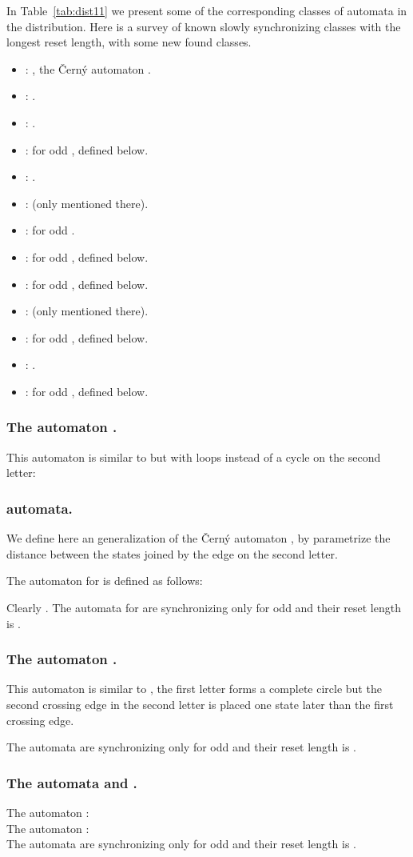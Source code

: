 \documentclass[runningheads,a4paper]{llncs}
\newcommand{\<}{\langle}
\renewcommand{\>}{\rangle}
\begin{document}
In Table~\ref{tab:dist11} we present some of the corresponding classes of automata in the distribution. Here is a survey of known slowly synchronizing classes with the longest reset length, with some new found classes.

\begin{itemize}
\item : , the \v{C}ern\'{y} automaton \cite{Ce1964}.
\item :  \cite{AGV2010}.
\item :  \cite{AGV2010}.
\item :  for odd , defined below.
\item :  \cite{AGV2010}.
\item :  \cite{AGV2010} (only mentioned there).
\item :  for odd  \cite{AVZ2006,AGV2010}.
\item :  for odd , defined below.
\item :  for odd , defined below.
\item :  \cite{AGV2010} (only mentioned there).
\item :  for odd , defined below.
\item :  \cite{AVZ2006}.
\item :  for odd , defined below.
\end{itemize}

\subsubsection{The automaton .}
This automaton is similar to  but with loops instead of a cycle on the second letter:



\subsubsection{ automata.}
We define here an generalization of the \v{C}ern\'{y} automaton , by parametrize the distance between the states joined by the edge on the second letter.

\begin{definition}The automaton  for  is defined as follows:


\end{definition}

Clearly . The automata for  are synchronizing only for odd  and their reset length is .

\subsubsection{The automaton .}
This automaton is similar to , the first letter forms a complete circle but the second crossing edge in the second letter is placed one state later than the first crossing edge.



The automata are synchronizing only for odd  and their reset length is .

\subsubsection{The automata  and .}
The automaton :\\


The automaton :\\


The automata are synchronizing only for odd  and their reset length is .


\end{document}
